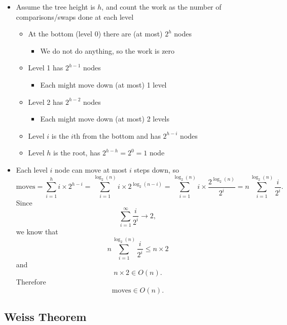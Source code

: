 \documentclass[
  10pt,
  english,
  letterpaper,
,tablecaptionabove
]{scrartcl}
\providecommand{\tightlist}{%
  \setlength{\itemsep}{0pt}\setlength{\parskip}{0pt}}
\begin{document}
\begin{itemize}
\tightlist
\item
  Assume the tree height is \(h\), and count the work as the number of
  comparisons/swaps done at each level

  \begin{itemize}
  \tightlist
  \item
    At the bottom (level 0) there are (at most) \(2^h\) nodes

    \begin{itemize}
    \tightlist
    \item
      We do not do anything, so the work is zero
    \end{itemize}
  \item
    Level 1 has \(2^{h-1}\) nodes

    \begin{itemize}
    \tightlist
    \item
      Each might move down (at most) 1 level
    \end{itemize}
  \item
    Level 2 has \(2^{h-2}\) nodes

    \begin{itemize}
    \tightlist
    \item
      Each might move down (at most) 2 levels
    \end{itemize}
  \item
    Level \(i\) is the \(i\)th from the bottom and has \(2^{h-i}\) nodes
  \item
    Level \(h\) is the root, has \(2^{h-h} = 2^0 = 1\) node
  \end{itemize}
\item
  Each level \(i\) node can move at most \(i\) steps down, so
  \[\text{moves} = \sum_{i=1}^h i\times 2^{h-i} = \sum_{i=1}^{\log_2(n)} i\times 2^{\log_2(n-i)} = \sum_{i=1}^{\log_2(n)} i\times \frac{2^{\log_2(n)}}{2^i} = n \sum_{i=1}^{\log_2(n)} \frac{i}{2^i}.\]
  Since \[\sum_{i=1}^\infty \frac{i}{2^i} \rightarrow 2,\] we know that
  \[n \sum_{i=1}^{\log_2(n)} \frac{i}{2^i} \leq n\times 2\] and
  \[n\times 2 \in O(n).\] Therefore \[\text{moves} \in O(n).\]
\end{itemize}

\hypertarget{weiss-theorem}{%
\subsection{Weiss Theorem}\label{weiss-theorem}}
\end{document}
